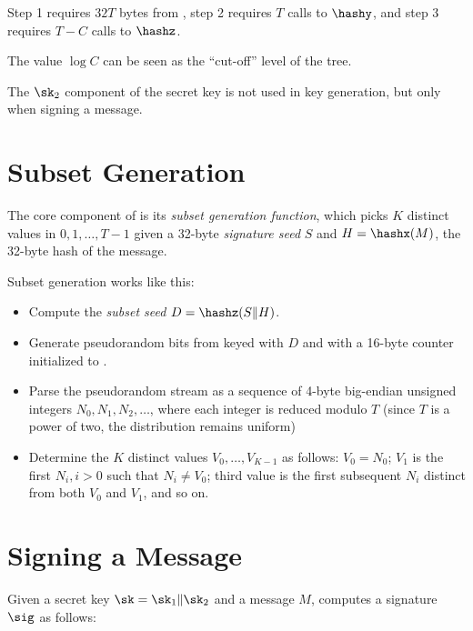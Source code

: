 Step 1 requires $32T$ bytes from \drbg, step 2 requires $T$ calls to $\hashy$, and step 3 requires $T - C$ calls to $\hashz$.

The value $\log C$ can be seen as the ``cut-off'' level of the tree.

The $\sk_2$ component of the secret key is not used in key generation, but only when signing a message.


\section{Subset Generation}\label{sec:subsetgen}

The core component of \gravity is its \emph{subset generation function}, which picks $K$ distinct values in $0, 1, \dots, T-1$ given a 32-byte \emph{signature seed} $S$ and $H = \hashx(M)$, the 32-byte hash of the message.

Subset generation works like this:

\begin{itemize}

\item Compute the \emph{subset seed} $D=\hashz(S\Vert H)$.

\item Generate pseudorandom bits from \drbg keyed with $D$ and with a 16-byte counter initialized to .

\item Parse the pseudorandom stream as a sequence of 4-byte big-endian unsigned integers $N_0, N_1, N_2, \dots$, where each integer is reduced modulo $T$ (since $T$ is a power of two, the distribution remains uniform)

\item Determine the $K$ distinct values $V_0,\dots,V_{K-1}$  as follows: $V_0=N_0$; $V_1$ is the first $N_i, i>0$ such that $N_i\neq V_0$; third value is the first subsequent $N_i$ distinct from both $V_0$ and $V_1$, and so on.

\end{itemize}

\section{Signing a Message}

Given a secret key $\sk=\sk_1\Vert \sk_2$ and a message $M$, \gravity computes a signature $\sig$ as follows:

